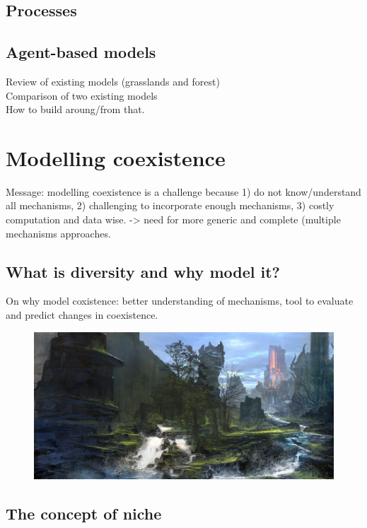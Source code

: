 \subsection{Processes}

\subsection{Agent-based models}

Review of existing models (grasslands and forest)\\
Comparison of two existing models\\
How to build aroung/from that.\\


\section{Modelling coexistence}
Message: modelling coexistence is a challenge because 1) do not know/understand all mechanisms, 2) challenging to incorporate enough mechanisms, 3) costly computation and data wise. -> need for more generic and complete (multiple mechanisms approaches.

\subsection{What is diversity and why model it?}

On why model coxistence: better understanding of mechanisms, tool to evaluate and predict changes in coexistence.

\begin{figure}
\includegraphics[scale=1]{./1_Introduction/graphics/plankton.jpg}
\end{figure}

\subsection{The concept of niche}


